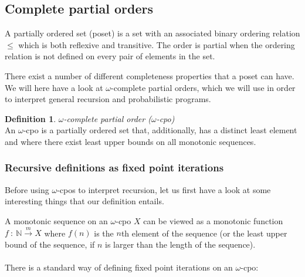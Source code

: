 \documentclass[11pt, leqno, titlepage]{article}
\theoremstyle{definition}
\newtheorem{defn}[thm]{Definition}
\begin{document}

\subsection{Complete partial orders}\label{sec:cpos}

A partially ordered set (poset) is a set with an associated binary ordering relation
$\leq$ which is both reflexive and transitive. The order is partial when the ordering
relation is not defined on every pair of elements in the set.

There exist a number of different completeness properties that a poset can have.
We will here have a look at $\omega$-complete partial orders, which we will use in
order to interpret general recursion and probabilistic programs. 

\begin{defn}
  \textit{$\omega$-complete partial order ($\omega$-cpo)}\\
  An $\omega$-cpo is a partially ordered set that, additionally, has a distinct least
  element and where there exist least upper bounds on all monotonic sequences. 
\end{defn}


\subsubsection{Recursive definitions as fixed point iterations}

Before using $\omega$-cpos to interpret recursion, let us first have a look at some
interesting things that our definition entails.

A monotonic sequence on an $\omega$-cpo $X$ can be viewed as a monotonic function
$f~:~\mathbb{N} \xrightarrow{m} X$ where $f(n)$ is the $n$th element of the sequence (or the
least upper bound of the sequence, if $n$ is larger than the length of the
sequence).\\
\\
There is a standard way of defining fixed point iterations on an $\omega$-cpo: %
\end{document}
